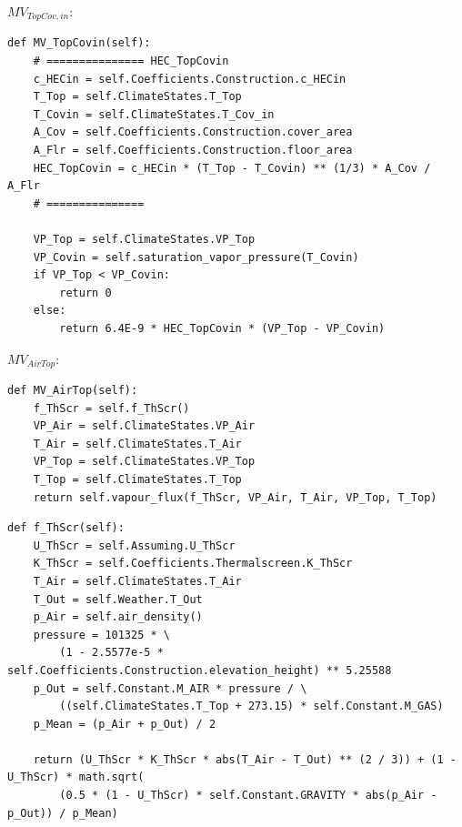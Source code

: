 \documentclass[a4paper]{article}
\begin{document}
\(MV_{TopCov,in}\):
\begin{mdframed}[leftline=false,rightline=false,backgroundcolor=magenta!10,nobreak=true]
  \begin{verbatim}
def MV_TopCovin(self):
    # =============== HEC_TopCovin
    c_HECin = self.Coefficients.Construction.c_HECin
    T_Top = self.ClimateStates.T_Top
    T_Covin = self.ClimateStates.T_Cov_in
    A_Cov = self.Coefficients.Construction.cover_area
    A_Flr = self.Coefficients.Construction.floor_area
    HEC_TopCovin = c_HECin * (T_Top - T_Covin) ** (1/3) * A_Cov / A_Flr
    # ===============

    VP_Top = self.ClimateStates.VP_Top
    VP_Covin = self.saturation_vapor_pressure(T_Covin)
    if VP_Top < VP_Covin:
        return 0
    else:
        return 6.4E-9 * HEC_TopCovin * (VP_Top - VP_Covin)
  \end{verbatim}
\end{mdframed}

\(MV_{AirTop}\):
\begin{mdframed}[leftline=false,rightline=false,backgroundcolor=magenta!10,nobreak=true]
  \begin{verbatim}
def MV_AirTop(self):
    f_ThScr = self.f_ThScr()
    VP_Air = self.ClimateStates.VP_Air
    T_Air = self.ClimateStates.T_Air
    VP_Top = self.ClimateStates.VP_Top
    T_Top = self.ClimateStates.T_Top
    return self.vapour_flux(f_ThScr, VP_Air, T_Air, VP_Top, T_Top)
  \end{verbatim}
\end{mdframed}
\begin{mdframed}[leftline=false,rightline=false,backgroundcolor=magenta!10,nobreak=true]
  \begin{verbatim}
def f_ThScr(self):
    U_ThScr = self.Assuming.U_ThScr
    K_ThScr = self.Coefficients.Thermalscreen.K_ThScr
    T_Air = self.ClimateStates.T_Air
    T_Out = self.Weather.T_Out
    p_Air = self.air_density()
    pressure = 101325 * \
        (1 - 2.5577e-5 * self.Coefficients.Construction.elevation_height) ** 5.25588
    p_Out = self.Constant.M_AIR * pressure / \
        ((self.ClimateStates.T_Top + 273.15) * self.Constant.M_GAS)
    p_Mean = (p_Air + p_Out) / 2

    return (U_ThScr * K_ThScr * abs(T_Air - T_Out) ** (2 / 3)) + (1 - U_ThScr) * math.sqrt(
        (0.5 * (1 - U_ThScr) * self.Constant.GRAVITY * abs(p_Air - p_Out)) / p_Mean)
  \end{verbatim}
\end{mdframed}
\end{document}
